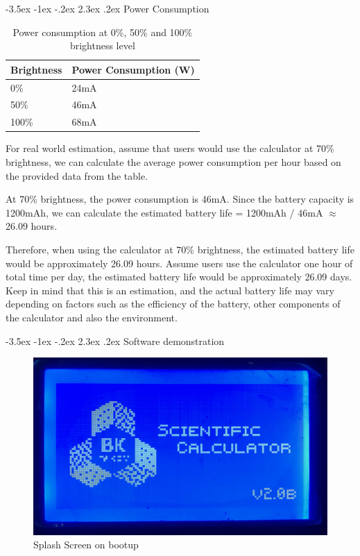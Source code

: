 \documentclass[a4paper, twoside]{report}
\makeatletter
\renewcommand\section{\@startsection {section}{1}{-1em}%
  {-3.5ex \@plus -1ex \@minus -.2ex}%
  {2.3ex \@plus.2ex}%
  {\normalfont\Large\bfseries}}
\makeatother
\begin{document}
\section{Power Consumption}
\begin{table}[H]
    \centering
    \begin{tabular}{|l|l|}
    \hline
        \textbf{Brightness} & \textbf{Power Consumption (W)} \\ \hline
        0\% & 24mA \\ \hline
        50\% & 46mA \\ \hline
        100\% & 68mA \\ \hline
    \end{tabular}
    \caption{Power consumption at 0\%, 50\% and 100\% brightness level}
\end{table}

For real world estimation, assume that users would use the calculator at 70\% brightness, we can calculate the average power consumption per hour based on the provided data from the table.

At 70\% brightness, the power consumption is 46mA. Since the battery capacity is 1200mAh, we can calculate the estimated battery life = 1200mAh / 46mA $\approx$ 26.09 hours.

Therefore, when using the calculator at 70\% brightness, the estimated battery life would be approximately 26.09 hours. Assume users use the calculator one hour of total time per day, the estimated battery life would be approximately 26.09 days. Keep in mind that this is an estimation, and the actual battery life may vary depending on factors such as the efficiency of the battery, other components of the calculator and also the environment.

\section{Software demonstration}
\begin{figure}[H]
    \centering
    \includegraphics[width=.7\textwidth]{LCDScreens/splash.jpeg}
    \caption{Splash Screen on bootup}
\end{figure}
\end{document}
